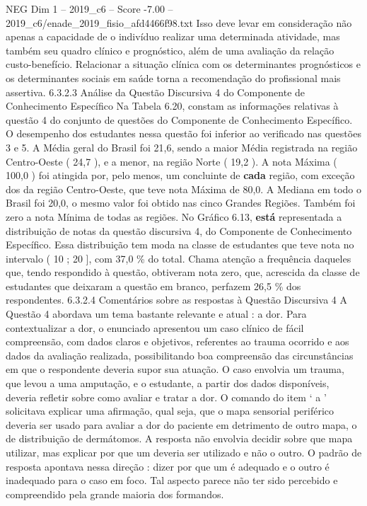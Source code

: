 \begin{textsample}{NEG Dim 1 – 2019\_c6 – Score -7.00 – 2019\_c6/enade\_2019\_fisio\_afd4466f98.txt}
Isso deve levar em consideração não apenas a capacidade de o indivíduo realizar uma determinada atividade, mas também seu quadro clínico e prognóstico, além de uma avaliação da relação custo-benefício.
Relacionar a situação clínica com os determinantes prognósticos e os determinantes sociais em saúde torna a recomendação do profissional mais assertiva. 6.3.2.3 Análise da Questão Discursiva 4 do Componente de Conhecimento Específico Na Tabela 6.20, constam as informações relativas à questão 4 do conjunto de questões do Componente de Conhecimento Específico.
O desempenho dos estudantes nessa questão foi inferior ao verificado nas questões 3 e 5.
A Média geral do Brasil foi 21,6, sendo a maior Média registrada na região Centro-Oeste ( 24,7 ), e a menor, na região Norte ( 19,2 ).
A nota Máxima ( 100,0 ) foi atingida por, pelo menos, um concluinte de \textbf{cada} região, com exceção dos da região Centro-Oeste, que teve nota Máxima de 80,0.
A Mediana em todo o Brasil foi 20,0, o mesmo valor foi obtido nas cinco Grandes Regiões.
Também foi zero a nota Mínima de todas as regiões.
No Gráfico 6.13, \textbf{está} representada a distribuição de notas da questão discursiva 4, do Componente de Conhecimento Específico.
Essa distribuição tem moda na classe de estudantes que teve nota no intervalo ( 10 ; 20 ], com 37,0 \% do total.
Chama atenção a frequência daqueles que, tendo respondido à questão, obtiveram nota zero, que, acrescida da classe de estudantes que deixaram a questão em branco, perfazem 26,5 \% dos respondentes. 6.3.2.4 Comentários sobre as respostas à Questão Discursiva 4 A Questão 4 abordava um tema bastante relevante e atual : a dor.
Para contextualizar a dor, o enunciado apresentou um caso clínico de fácil compreensão, com dados claros e objetivos, referentes ao trauma ocorrido e aos dados da avaliação realizada, possibilitando boa compreensão das circunstâncias em que o respondente deveria supor sua atuação.
O caso envolvia um trauma, que levou a uma amputação, e o estudante, a partir dos dados disponíveis, deveria refletir sobre como avaliar e tratar a dor.
O comando do item ‘ a ’ solicitava explicar uma afirmação, qual seja, que o mapa sensorial periférico deveria ser usado para avaliar a dor do paciente em detrimento de outro mapa, o de distribuição de dermátomos.
A resposta não envolvia decidir sobre que mapa utilizar, mas explicar por que um deveria ser utilizado e não o outro.
O padrão de resposta apontava nessa direção : dizer por que um é adequado e o outro é inadequado para o caso em foco.
Tal aspecto parece não ter sido percebido e compreendido pela grande maioria dos formandos.

\end{textsample}
